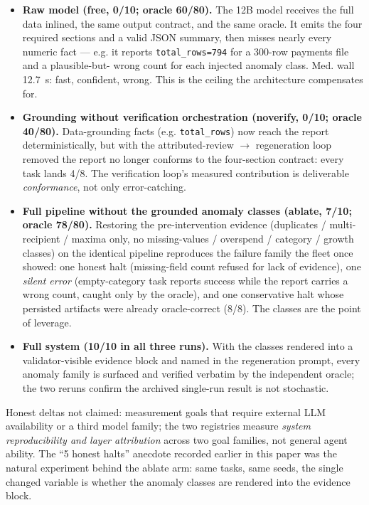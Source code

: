 \documentclass[11pt]{article}
\begin{document}
\begin{itemize}
  \item \textbf{Raw model (free, 0/10; oracle 60/80).} The 12B model receives the full data
        inlined, the same output contract, and the same oracle. It emits the four required
        sections and a valid JSON summary, then misses nearly every numeric fact --- e.g.
        it reports \texttt{total\_rows=794} for a 300-row payments file and a plausible-but-
        wrong count for each injected anomaly class. Med. wall 12.7~s: fast, confident,
        wrong. This is the ceiling the architecture compensates for.
  \item \textbf{Grounding without verification orchestration (noverify, 0/10; oracle 40/80).}
        Data-grounding facts (e.g. \texttt{total\_rows}) now reach the report
        deterministically, but with the attributed-review $\rightarrow$ regeneration loop
        removed the report no longer conforms to the four-section contract: every task
        lands 4/8. The verification loop's measured contribution is deliverable
        \emph{conformance}, not only error-catching.
  \item \textbf{Full pipeline without the grounded anomaly classes (ablate, 7/10; oracle
        78/80).} Restoring the pre-intervention evidence (duplicates / multi-recipient /
        maxima only, no missing-values / overspend / category / growth classes) on the
        identical pipeline reproduces the failure family the fleet once showed: one honest
        halt (missing-field count refused for lack of evidence), one \emph{silent error}
        (empty-category task reports success while the report carries a wrong count, caught
        only by the oracle), and one conservative halt whose persisted artifacts were
        already oracle-correct (8/8). The classes are the point of leverage.
  \item \textbf{Full system (10/10 in all three runs).} With the classes rendered into a
        validator-visible evidence block and named in the regeneration prompt, every
        anomaly family is surfaced and verified verbatim by the independent oracle; the two
        reruns confirm the archived single-run result is not stochastic.
\end{itemize}

Honest deltas not claimed: measurement goals that require external LLM availability or a
third model family; the two registries measure \emph{system reproducibility and layer
attribution} across two goal families, not general agent ability. The ``5 honest halts''
anecdote recorded earlier in this paper was the natural experiment behind the ablate arm:
same tasks, same seeds, the single changed variable is whether the anomaly classes are
rendered into the evidence block.
\end{document}
